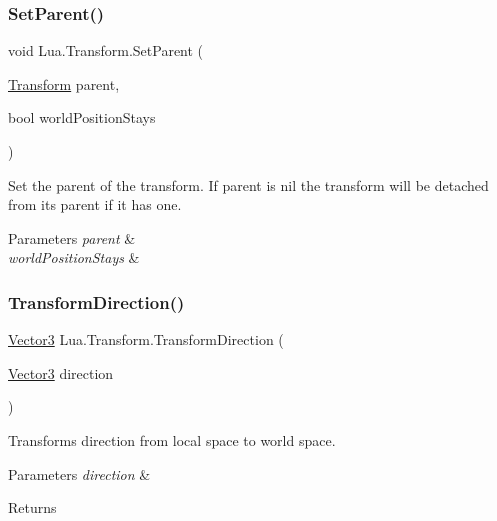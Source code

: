 \subsubsection{\texorpdfstring{SetParent()}{SetParent()}\hspace{0.1cm}{\footnotesize\ttfamily [2/2]}}
{\footnotesize\ttfamily void Lua.\+Transform.\+Set\+Parent (\begin{DoxyParamCaption}\item[{\mbox{\hyperlink{class_lua_1_1_transform}{Transform}}}]{parent,  }\item[{bool}]{world\+Position\+Stays }\end{DoxyParamCaption})}



Set the parent of the transform. If parent is nil the transform will be detached from its parent if it has one. 


\begin{DoxyParams}{Parameters}
{\em parent} & \\
\hline
{\em world\+Position\+Stays} & \\
\hline
\end{DoxyParams}
\mbox{\label{class_lua_1_1_transform_a14270ac6dbade453decf26513f533b66}} 
\subsubsection{\texorpdfstring{TransformDirection()}{TransformDirection()}\hspace{0.1cm}{\footnotesize\ttfamily [1/2]}}
{\footnotesize\ttfamily \mbox{\hyperlink{class_lua_1_1_vector3}{Vector3}} Lua.\+Transform.\+Transform\+Direction (\begin{DoxyParamCaption}\item[{\mbox{\hyperlink{class_lua_1_1_vector3}{Vector3}}}]{direction }\end{DoxyParamCaption})}



Transforms direction from local space to world space. 


\begin{DoxyParams}{Parameters}
{\em direction} & \\
\hline
\end{DoxyParams}
\begin{DoxyReturn}{Returns}

\end{DoxyReturn}
\mbox{\label{class_lua_1_1_transform_ac828e92537ee4ca71ef3525f3f19511a}} 
